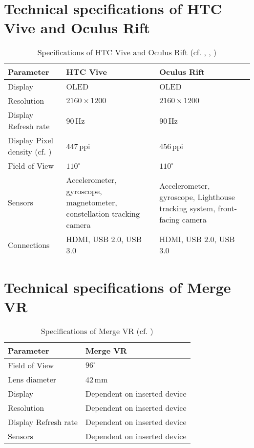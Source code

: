 \section{Technical specifications of HTC Vive and Oculus Rift} \label{appendix:vive_rift_specs}


\begin{table}[!h]
	\centering
	\begin{tabular}{|p{2.8cm}|p{4.8cm}|p{4.8cm}|}\hline
		\rowcolor[gray] {.6} \textbf{Parameter} & \textbf{HTC Vive} & \textbf{Oculus Rift} \\ \hline
		Display & OLED & OLED \\ \hline
		Resolution & $2160 \times 1200$ & $2160 \times 1200$ \\ \hline
		Display Refresh rate & 90\,Hz & 90\,Hz \\ \hline
		Display Pixel density (cf. \cite{link:tomshardware_vive_rift_specs}) & 447\,ppi & 456\,ppi \\ \hline
		Field of View & $110^{\circ}$ & $110^{\circ}$ \\ \hline
		Sensors & Accelerometer, gyroscope, magnetometer, constellation tracking camera & Accelerometer, gyroscope, Lighthouse tracking system, front-facing camera \\ \hline
		Connections & HDMI, USB 2.0, USB 3.0 & HDMI, USB 2.0, USB 3.0 \\ \hline
	\end{tabular}
	\caption{Specifications of HTC Vive and Oculus Rift (cf.  \cite{link:tomshardware_vive_rift_specs}, \cite{link:rift_vive_specs_digitaltrends}, \cite{link:vive_homepage})}
	\label{table:specs_vive_rift}
\end{table}

\section{Technical specifications of Merge VR} \label{appendix:mergevr_specs}

\begin{table}[!h]
	\centering
	\begin{tabular}{|p{2.8cm}|p{6cm}|}\hline
		\rowcolor[gray] {.6} \textbf{Parameter} & \textbf{Merge VR} \\ \hline
		Field of View & $96^{\circ}$ \\ \hline
		Lens diameter & 42\,mm \\ \hline
		Display & Dependent on inserted device \\ \hline
		Resolution & Dependent on inserted device \\ \hline
		Display Refresh rate & Dependent on inserted device \\ \hline
		Sensors & Dependent on inserted device \\ \hline
	\end{tabular}
	\caption{Specifications of Merge VR (cf. \cite{link:mergevr_goggles})}
	\label{table:mergevr_specs}
\end{table}


